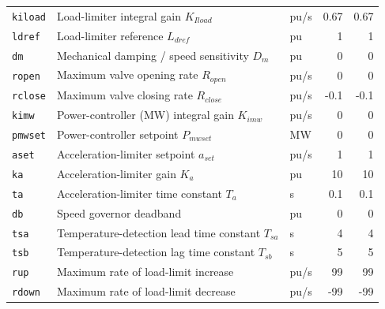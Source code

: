 \begin{tabularx}{\linewidth}{@{}l X l r r@{}}
\texttt{kiload} & Load-limiter integral gain $K_{Iload}$ & pu/s & 0.67 & 0.67 \\
\texttt{ldref} & Load-limiter reference $L_{dref}$ & pu & 1 & 1 \\
\texttt{dm} & Mechanical damping / speed sensitivity $D_m$ & pu & 0 & 0 \\
\texttt{ropen} & Maximum valve opening rate $R_{open}$ & pu/s & 0 & 0 \\
\texttt{rclose} & Maximum valve closing rate $R_{close}$ & pu/s & -0.1 & -0.1 \\
\texttt{kimw} & Power-controller (MW) integral gain $K_{imw}$ & pu/s & 0 & 0 \\
\texttt{pmwset} & Power-controller setpoint $P_{mwset}$ & MW & 0 & 0 \\
\texttt{aset} & Acceleration-limiter setpoint $a_{set}$ & pu/s & 1 & 1 \\
\texttt{ka} & Acceleration-limiter gain $K_a$ & pu & 10 & 10 \\
\texttt{ta} & Acceleration-limiter time constant $T_a$ & s & 0.1 & 0.1 \\
\texttt{db} & Speed governor deadband & pu & 0 & 0 \\
\texttt{tsa} & Temperature-detection lead time constant $T_{sa}$ & s & 4 & 4 \\
\texttt{tsb} & Temperature-detection lag time constant $T_{sb}$ & s & 5 & 5 \\
\texttt{rup} & Maximum rate of load-limit increase & pu/s & 99 & 99 \\
\texttt{rdown} & Maximum rate of load-limit decrease & pu/s & -99 & -99 \\
\bottomrule
\end{tabularx}

